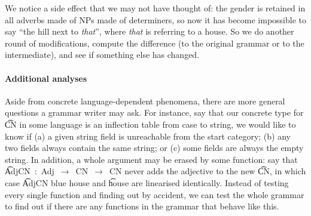 We notice a side effect that we may not have thought of: the
gender is retained in all adverbs made of NPs made of determiners, so
now it has become impossible to say ``the hill next to \emph{that}'',
where \emph{that} is referring to a house. So we do another round of
modifications, compute the difference (to the original grammar or to
the intermediate), and see if something else has changed.

\paragraph{Additional analyses}
Aside from concrete language-dependent phenomena, there are more
general questions a grammar writer may ask. For instance, say that our
concrete type for \t{CN} in some language is an inflection table from
case to string, we would like to know if (a) a given string field is
unreachable from the start category; (b) any two fields always contain
the same string; or (c) some fields are always the empty string.  In
addition, a whole argument may be erased by some function: say that
\t{AdjCN~:~Adj~$\rightarrow$~CN~$\rightarrow$~CN} never adds the
adjective to the new \t{CN}, in which case \t{AdjCN blue house} and
\t{house} are linearised identically. Instead of testing every single
function and finding out by accident, we can test the whole grammar to
find out if there are any functions in the grammar that behave like
this. %




